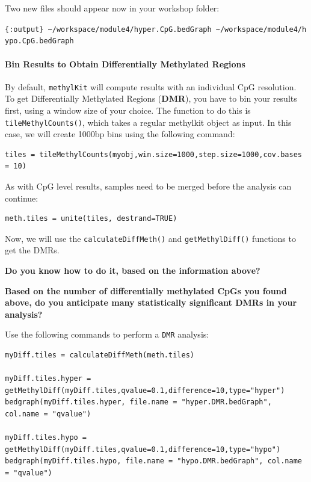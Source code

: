 \documentclass[
]{book}
\begin{document}
Two new files should appear now in your workshop folder:

\texttt{\{:output\}\ \textasciitilde{}/workspace/module4/hyper.CpG.bedGraph\ \textasciitilde{}/workspace/module4/hypo.CpG.bedGraph}

\paragraph{Bin Results to Obtain Differentially Methylated Regions}\label{bin-results-to-obtain-differentially-methylated-regions}

By default, \texttt{methylKit} will compute results with an individual CpG resolution. To get Differentially Methylated Regions (\textbf{DMR}), you have to bin your results first, using a window size of your choice. The function to do this is \texttt{tileMethylCounts()}, which takes a regular methylkit object as input. In this case, we will create 1000bp bins using the following command:

\begin{verbatim}
tiles = tileMethylCounts(myobj,win.size=1000,step.size=1000,cov.bases = 10)
\end{verbatim}

As with CpG level results, samples need to be merged before the analysis can continue:

\begin{verbatim}
meth.tiles = unite(tiles, destrand=TRUE) 
\end{verbatim}

Now, we will use the \texttt{calculateDiffMeth()} and \texttt{getMethylDiff()} functions to get the DMRs.

\textbf{Do you know how to do it, based on the information above?}

\textbf{Based on the number of differentially methylated CpGs you found above, do you anticipate many statistically significant DMRs in your analysis?}

Use the following commands to perform a \texttt{DMR} analysis:

\begin{verbatim}
myDiff.tiles = calculateDiffMeth(meth.tiles)

myDiff.tiles.hyper = getMethylDiff(myDiff.tiles,qvalue=0.1,difference=10,type="hyper")
bedgraph(myDiff.tiles.hyper, file.name = "hyper.DMR.bedGraph", col.name = "qvalue")

myDiff.tiles.hypo = getMethylDiff(myDiff.tiles,qvalue=0.1,difference=10,type="hypo")
bedgraph(myDiff.tiles.hypo, file.name = "hypo.DMR.bedGraph", col.name = "qvalue")

\end{verbatim}
\end{document}
